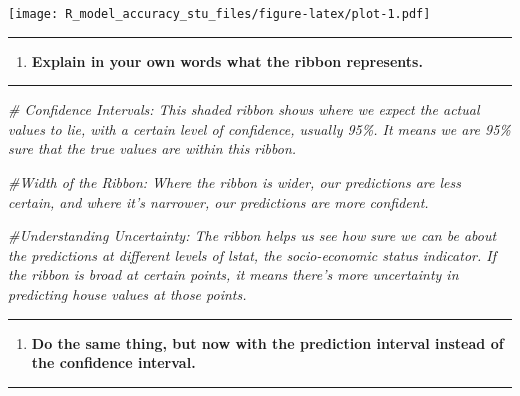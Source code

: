 \documentclass[
  12pt,
]{article}
\newenvironment{Shaded}{\begin{snugshade}}{\end{snugshade}}
\newcommand{\CommentTok}[1]{\textcolor[rgb]{0.56,0.35,0.01}{\textit{#1}}}
\providecommand{\tightlist}{%
  \setlength{\itemsep}{0pt}\setlength{\parskip}{0pt}}
\begin{document}
\texttt{[image: R\_model\_accuracy\_stu\_files/figure-latex/plot-1.pdf]}

\begin{center}\rule{0.5\linewidth}{0.5pt}\end{center}

\begin{enumerate}
\def\labelenumi{\arabic{enumi}.}
\setcounter{enumi}{7}
\tightlist
\item
  \textbf{Explain in your own words what the ribbon represents.}
\end{enumerate}

\begin{center}\rule{0.5\linewidth}{0.5pt}\end{center}

\begin{Shaded}
\begin{Highlighting}[]
\CommentTok{\# Confidence Intervals: This shaded ribbon shows where we expect the actual values to lie, with a certain level of confidence, usually 95\%. It means we are 95\% sure that the true values are within this ribbon.}

\CommentTok{\#Width of the Ribbon: Where the ribbon is wider, our predictions are less certain, and where it’s narrower, our predictions are more confident.}

\CommentTok{\#Understanding Uncertainty: The ribbon helps us see how sure we can be about the predictions at different levels of lstat, the socio{-}economic status indicator. If the ribbon is broad at certain points, it means there’s more uncertainty in predicting house values at those points.}
\end{Highlighting}
\end{Shaded}

\begin{center}\rule{0.5\linewidth}{0.5pt}\end{center}

\begin{enumerate}
\def\labelenumi{\arabic{enumi}.}
\setcounter{enumi}{8}
\tightlist
\item
  \textbf{Do the same thing, but now with the prediction interval
  instead of the confidence interval.}
\end{enumerate}

\begin{center}\rule{0.5\linewidth}{0.5pt}\end{center}
\end{document}
